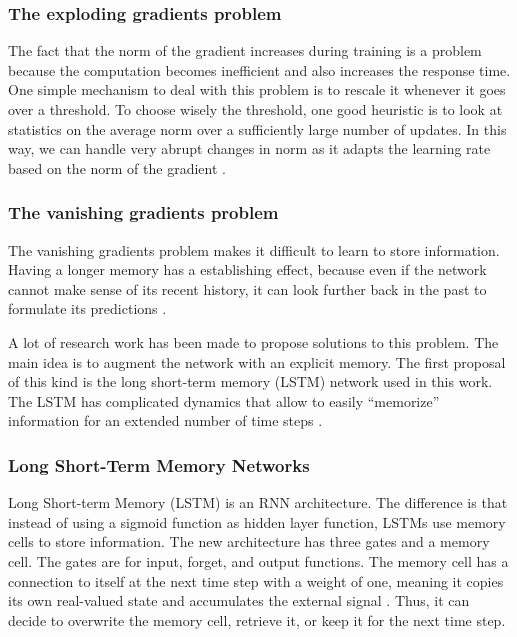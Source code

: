 \subsubsection*{The exploding gradients problem}
 The fact that the norm of the gradient increases during training is a problem because the computation becomes inefficient and also increases the response time. One simple mechanism to deal with this problem is to rescale it whenever it goes over a threshold. To choose wisely the threshold, one good heuristic is to look at statistics on the average norm over a sufficiently large number of updates. In this way, we can handle very abrupt changes in norm as it adapts the learning rate based on the norm of the gradient  \cite{pascanu2013difficulty}.

\subsubsection*{The vanishing gradients problem}

The vanishing gradients problem makes it difficult to learn to store information. Having a longer memory has a establishing effect, because even if the network cannot make sense of its recent history, it can look further back in the past to formulate its predictions \cite{graves2013generating}.


A lot of research work has been made to propose solutions to this problem. The main idea is to augment the network with an explicit memory. The first proposal of this kind is the long short-term memory (LSTM) network used in this work. The LSTM has complicated dynamics that allow to easily “memorize” information for an extended number of time steps \cite{zaremba2014recurrent}.

\subsubsection{Long Short-Term Memory Networks}
Long Short-term Memory (LSTM) is an RNN architecture. The difference is that instead of using a sigmoid function as hidden layer function, LSTMs use memory cells to store information. The new architecture has three gates and a memory cell. The gates are for input, forget, and output functions. The memory cell has a connection to itself at the next time step with a weight of one, meaning it copies its own real-valued state and accumulates the external signal \cite{lecun2015deep}. Thus, it can decide to overwrite the memory cell, retrieve it, or keep it for the next time step\cite{zaremba2014recurrent}. 

